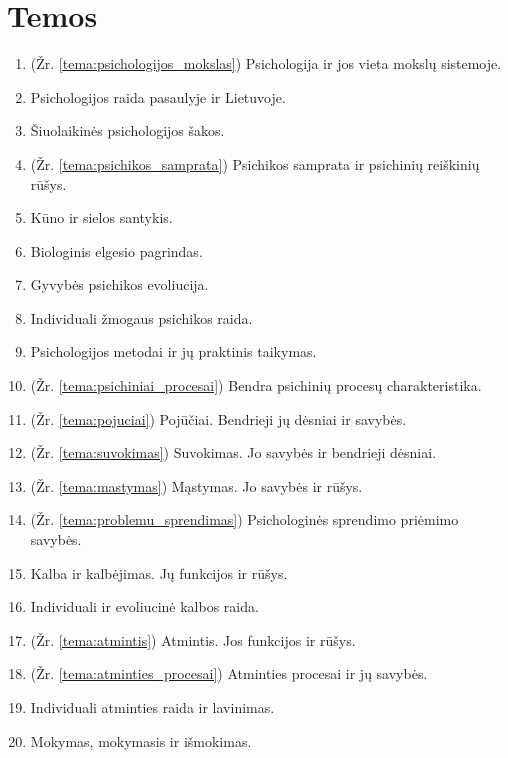 \chapter{Temos}

\begin{enumerate}
  \item \label{tema_01} (Žr. \ref{tema:psichologijos_mokslas})
    Psichologija ir jos vieta mokslų sistemoje.
  \item \label{tema_02} Psichologijos raida pasaulyje ir Lietuvoje.
  \item \label{tema_03} Šiuolaikinės psichologijos šakos.
  \item \label{tema_04} (Žr. \ref{tema:psichikos_samprata})
    Psichikos samprata ir psichinių reiškinių rūšys.
  \item \label{tema_05} Kūno ir sielos santykis.
  \item \label{tema_06} Biologinis elgesio pagrindas.
  \item \label{tema_07} Gyvybės psichikos evoliucija.
  \item \label{tema_10} Individuali žmogaus psichikos raida.
  \item \label{tema_11} Psichologijos metodai ir jų praktinis taikymas.
  \item \label{tema_12} (Žr. \ref{tema:psichiniai_procesai})
    Bendra psichinių procesų charakteristika.
  \item \label{tema_13} (Žr. \ref{tema:pojuciai})
    Pojūčiai. Bendrieji jų dėsniai ir savybės.
  \item \label{tema_14} (Žr. \ref{tema:suvokimas})
    Suvokimas. Jo savybės ir bendrieji dėsniai.
  \item \label{tema_15} (Žr. \ref{tema:mastymas})
    Mąstymas. Jo savybės ir rūšys.
  \item \label{tema_16} (Žr. \ref{tema:problemu_sprendimas})
    Psichologinės sprendimo priėmimo savybės.
  \item \label{tema_17} Kalba ir kalbėjimas. Jų funkcijos ir rūšys.
  \item \label{tema_20} Individuali ir evoliucinė kalbos raida.
  \item \label{tema_21} (Žr. \ref{tema:atmintis})
    Atmintis. Jos funkcijos ir rūšys.
  \item \label{tema_22} (Žr. \ref{tema:atminties_procesai})
    Atminties procesai ir jų savybės.
  \item \label{tema_23} Individuali atminties raida ir lavinimas.
  \item \label{tema_24} Mokymas, mokymasis ir išmokimas.

\end{enumerate}
